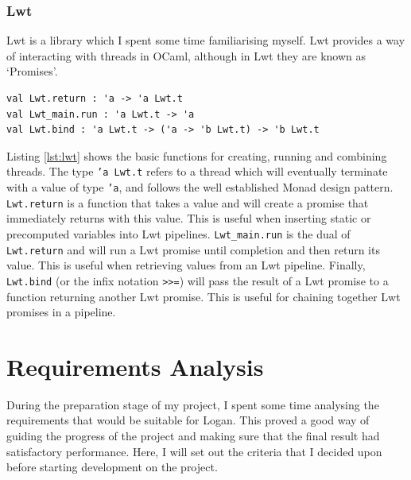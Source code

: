 \documentclass[12pt,a4paper,twoside,openright]{report}
\begin{document}
	\subsubsection*{Lwt}
	Lwt \parencite{Lwt} is a library which I spent some time familiarising myself. 
	Lwt provides a way of interacting with threads in OCaml, although in Lwt they are known as `Promises'.\\
	\begin{lstlisting}[caption={Lwt Promises},label={lst:lwt}]
val Lwt.return : 'a -> 'a Lwt.t 
val Lwt_main.run : 'a Lwt.t -> 'a
val Lwt.bind : 'a Lwt.t -> ('a -> 'b Lwt.t) -> 'b Lwt.t
	\end{lstlisting}
	\noindent Listing \ref{lst:lwt} shows the basic functions for creating, running and combining threads.
	The type \texttt{'a Lwt.t} refers to a thread which will eventually terminate with a value of type \texttt{'a}, and follows the well established Monad design pattern.
	\texttt{Lwt.return} is a function that takes a value and will create a promise that immediately returns with this value.
	This is useful when inserting static or precomputed variables into Lwt pipelines.
	\texttt{Lwt\_main.run} is the dual of \texttt{Lwt.return} and will run a Lwt promise until completion and then return its value.
	This is useful when retrieving values from an Lwt pipeline.
	Finally, \texttt{Lwt.bind} (or the infix notation \texttt{>>=}) will pass the result of a Lwt promise to a function returning another Lwt promise.
	This is useful for chaining together Lwt promises in a pipeline.

	\section{Requirements Analysis} \label{Requirements Analysis}
	During the preparation stage of my project, I spent some time analysing the requirements that would be suitable for Logan. 
	This proved a good way of guiding the progress of the project and making sure that the final result had satisfactory performance. 
	Here, I will set out the criteria that I decided upon before starting development on the project.
\end{document}

